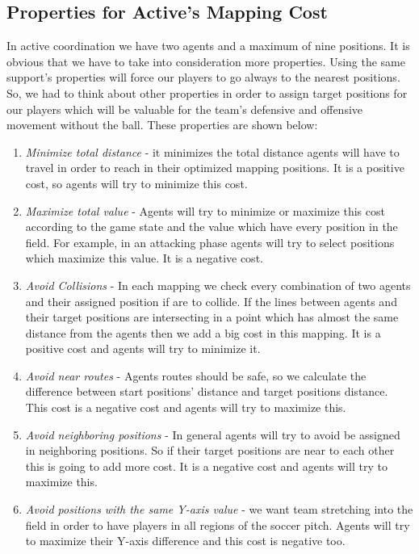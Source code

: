 \subsection{Properties for Active's Mapping Cost}
In active coordination we have two agents and a maximum of nine positions. It is obvious that we have to take into consideration more properties. Using the same support's properties will force our players to go always to the nearest positions. So, we had to think about other properties in order to assign target positions for our players which will be valuable for the team's defensive and offensive movement without the ball. These properties are shown below:
\begin{enumerate}
\item \textit{Minimize total distance} - it minimizes the total distance agents will have to travel in order to reach in their optimized mapping positions. It is a positive cost, so agents will try to minimize this cost.
\item \textit{Maximize total value}	- Agents will try to minimize or maximize this cost according to the game state and the value which have every position in the field. For example, in an attacking phase agents will try to select positions which maximize this value. It is a negative cost.
\item \textit{Avoid Collisions} - In each mapping we check every combination of two agents and their assigned position if are to collide. If the lines between agents and their target positions are intersecting in a point which has almost the same distance from the agents then we add a big cost in this mapping. It is a positive cost and agents will try to minimize it.
\item \textit{Avoid near routes} - Agents routes should be safe, so we calculate the difference between start positions' distance and target positions distance. This cost is a negative cost and agents will try to maximize this.
\item \textit{Avoid neighboring positions} - In general agents will try to avoid be assigned in neighboring positions. So if their target positions are near to each other this is going to add more cost. It is a negative cost and agents will try to maximize this.
\item \textit{Avoid positions with the same Y-axis value} - we want team stretching into the field in order to have players in all regions of the soccer pitch. Agents will try to maximize their Y-axis difference and this cost is negative too. 
\end{enumerate}
